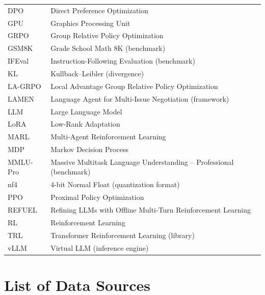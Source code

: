 \documentclass[12pt,a4paper]{article}
\begin{document}
\begin{tabular}{ll}
DPO       & Direct Preference Optimization \\
GPU       & Graphics Processing Unit \\
GRPO      & Group Relative Policy Optimization \\
GSM8K     & Grade School Math 8K (benchmark) \\
IFEval    & Instruction-Following Evaluation (benchmark) \\
KL        & Kullback--Leibler (divergence) \\
LA-GRPO   & Local Advantage Group Relative Policy Optimization \\
LAMEN     & Language Agent for Multi-Issue Negotiation (framework) \\
LLM       & Large Language Model \\
LoRA      & Low-Rank Adaptation \\
MARL      & Multi-Agent Reinforcement Learning \\
MDP       & Markov Decision Process \\
MMLU-Pro  & Massive Multitask Language Understanding -- Professional (benchmark) \\
nf4       & 4-bit Normal Float (quantization format) \\
PPO       & Proximal Policy Optimization \\
REFUEL    & Refining LLMs with Offline Multi-Turn Reinforcement Learning \\
RL        & Reinforcement Learning \\
TRL       & Transformer Reinforcement Learning (library) \\
vLLM      & Virtual LLM (inference engine) \\
\end{tabular}

\newpage
\listoffigures
{}

\newpage
\listoftables
{}

\newpage
\section*{List of Data Sources}
\end{document}
